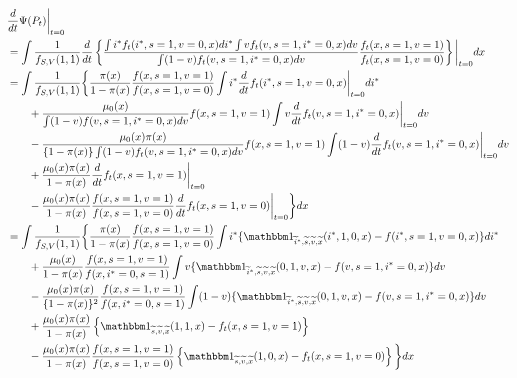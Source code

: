 \documentclass{article}
\begin{document}
\begin{align*}
   &\frac{d}{dt} \Psi(P_t)\bigg\vert_{t=0} \\
   &= \int \dfrac{1}{f_{S,V}(1, 1)} \frac{d}{dt} \left\{\dfrac{\int i^* f_t(i^*, s=1,v=0,x)di^* \int v f_t(v, s=1, i^*=0, x)dv}{\int(1 - v) f_t(v, s=1, i^*=0, x)dv} \dfrac{f_t(x, s=1, v=1)}{f_t(x, s=1, v=0)} \right\} \bigg\vert_{t=0}dx \\
   &= \int \dfrac{1}{f_{S,V}(1, 1)}\bigg\{ \dfrac{\pi(x)}{1-\pi(x)} \dfrac{f(x, s=1, v=1)}{f(x, s=1, v=0)}\int i^* \frac{d}{dt} f_t(i^*, s=1,v=0,x) \bigg\vert_{t=0} di^* \\
   &\qquad + \dfrac{\mu_0(x)}{\int(1 - v) f(v, s=1, i^*=0, x)dv}f(x, s=1, v=1) \int v \frac{d}{dt}f_t(v, s=1, i^*=0, x) \bigg\vert_{t=0} dv \\ 
   &\qquad - \dfrac{\mu_0(x)\pi(x)}{\{1 - \pi(x)\}\int(1 - v) f_t(v, s=1, i^*=0, x)dv} f(x, s=1, v=1) \int (1-v) \frac{d}{dt}f_t(v, s=1, i^*=0, x) \bigg\vert_{t=0} dv \\
   &\qquad + \dfrac{\mu_0(x)\pi(x)}{1-\pi(x)} \frac{d}{dt} f_t(x, s=1, v=1) \bigg\vert_{t=0} \\
   &\qquad - \dfrac{\mu_0(x)\pi(x)}{1-\pi(x)} \dfrac{f(x, s=1, v=1)}{f(x, s=1, v=0)} \frac{d}{dt} f_t(x, s=1, v=0) \bigg\vert_{t=0} \bigg\}dx \\
   &= \int \dfrac{1}{f_{S,V}(1, 1)}\bigg\{ \dfrac{\pi(x)}{1-\pi(x)} \dfrac{f(x, s=1, v=1)}{f(x, s=1, v=0)}\int i^* \{ \mathbbm 1_{\widetilde i^*, \widetilde s, \widetilde v, \widetilde x}(i^*, 1, 0, x) - f(i^*, s=1,v=0,x) \} di^* \\
   &\qquad + \dfrac{\mu_0(x)}{1-\pi(x)} \dfrac{f(x, s=1, v=1)}{f(x, i^*=0, s=1)} \int v \{\mathbbm 1_{\widetilde i^*, \widetilde s, \widetilde v, \widetilde x}(0, 1, v, x) - f(v, s=1, i^*=0, x) \} dv \\ 
   &\qquad -\dfrac{\mu_0(x)\pi(x)}{\{1 - \pi(x)\}^2} \dfrac{f(x, s=1, v=1)}{f(x, i^*=0, s=1)} \int (1 - v) \{\mathbbm 1_{\widetilde i^*, \widetilde s, \widetilde v, \widetilde x}(0, 1, v, x) - f(v, s=1, i^*=0, x) \} dv  \\
   & \qquad + \dfrac{\mu_0(x)\pi(x)}{1-\pi(x)} \left\{\mathbbm 1_{\widetilde s, \widetilde v, \widetilde x}(1,1,x) - f_t(x, s=1, v=1) \right\} \\
   & \qquad - \dfrac{\mu_0(x)\pi(x)}{1-\pi(x)} \dfrac{f(x, s=1, v=1)}{f(x, s=1, v=0)} \left\{\mathbbm 1_{\widetilde s, \widetilde v, \widetilde x}(1,0,x) - f_t(x, s=1, v=0) \right\}  \bigg\}dx\\

\end{align*}
\end{document}
